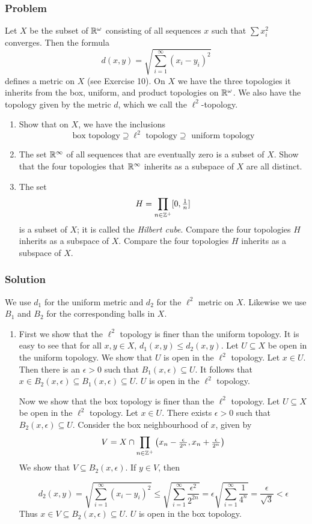 \subsubsection{Problem}
Let $X$ be the subset of $\mathbb R^\omega$ consisting of all sequences $x$ such that $\sum x_i^2$ converges. Then the formula
\[d(x,y) = \sqrt{\sum_{i=1}^\infty (x_i - y_i)^2}\]
defines a metric on $X$ (see Exercise 10). On $X$ we have the three topologies it inherits from the box, uniform, and product topologies on $\mathbb R^\omega$. We also have the topology given by the metric $d$, which we call the $\ell^2$-topology.
\begin{enumerate}
\item Show that on $X$, we have the inclusions
\[\textrm{box topology} \supseteq \ell^2 \textrm { topology} \supseteq \textrm{ uniform topology}\]
\item The set $\mathbb R^\infty$ of all sequences that are eventually zero is a subset of $X$. Show that the four topologies that $\mathbb R^\infty$ inherits as a subspace of $X$ are all distinct.
\item The set
\[H = \prod_{n \in \mathbb Z^+} [0, \tfrac1n]\]
is a subset of $X$; it is called the \emph{Hilbert cube}. Compare the four topologies $H$ inherits as a subspace of $X$. Compare the four topologies $H$ inherits as a subspace of $X$.
\end{enumerate}

\subsubsection{Solution}
We use $d_1$ for the uniform metric and $d_2$ for the $\ell^2$ metric on $X$. Likewise we use $B_1$ and $B_2$ for the corresponding balls in $X$.
\begin{enumerate}
\item First we show that the $\ell^2$ topology is finer than the uniform topology. It is easy to see that for all $x, y \in X$, $d_1(x,y) \leq d_2(x,y)$.
Let $U \subseteq X$ be open in the uniform topology. We show that $U$ is open in the $\ell^2$ topology. Let $x \in U$. Then there is an $\epsilon > 0$ such that $B_1(x, \epsilon) \subseteq U$. It follows that $x \in B_2(x, \epsilon) \subseteq B_1(x, \epsilon) \subseteq U$. $U$ is open in the $\ell^2$ topology.

Now we show that the box topology is finer than the $\ell^2$ topology. Let $U \subseteq X$ be open in the $\ell^2$ topology. Let $x \in U$. There exists $\epsilon > 0$ such that $B_2(x, \epsilon) \subseteq U$. Consider the box neighbourhood of $x$, given by
\[V = X \cap \prod_{n \in \mathbb Z^+} \left(x_n-\tfrac{\epsilon}{2^n},x_n+\tfrac{\epsilon}{2^n}  \right)\]
We show that $V \subseteq B_2(x, \epsilon)$. If $y \in V$, then

\[
d_2(x,y) = \sqrt{\sum_{i=1}^\infty (x_i - y_i)^2} 
\leq \sqrt{\sum_{i=1}^\infty \frac{\epsilon^2}{2^{2n}}} 
= \epsilon\sqrt{\sum_{i=1}^\infty \frac{1}{4^n}} 
= \frac{\epsilon}{\sqrt 3}
< \epsilon
\]
Thus $x \in V \subseteq B_2(x, \epsilon) \subseteq U$. $U$ is open in the box topology.
\end{enumerate}


